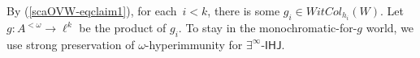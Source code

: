 \documentclass{article}
\def\msf{\mathsf}
\def\uhr{\upharpoonright}
\def\wsamelong{\mathsf{WSub}^{=}}
\def\vwsamelong{\mathsf{OSub}^=}
\def\nonprogressable{non-progressable}
\def\wc{WitCol}
\def\wHJ{$\exists^\infty$-$\msf{IHJ}$}
\def\maximallynonprogressable{maximize the set of \nonprogressable\ initial segments}
\newcommand{\NN}[0]{\mathbb{N}}
\numberwithin{theorem}{section}
\newtheorem{claim}{Claim}
\theoremstyle{definition}
\begin{document}
By (\ref{scaOVW-eqclaim1}), for each~$i < k$, there is some $g_i\in\wc_{h_i}(W)$. Let $g : A^{<\omega} \to \ell^k$ be the product of $g_i$.
To stay in the monochromatic-for-$g$ world, we use
strong preservation of $\omega$-hyperimmunity for \wHJ.
\end{document}

